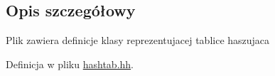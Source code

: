 \subsection{\-Opis szczegółowy}
\-Plik zawiera definicje klasy reprezentujacej tablice haszujaca 

\-Definicja w pliku \hyperlink{hashtab_8hh_source}{hashtab.\-hh}.

